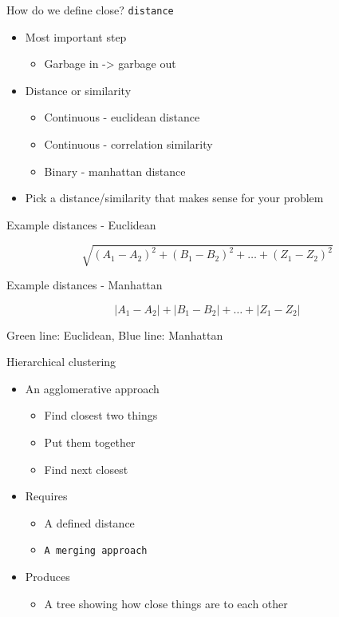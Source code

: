 \documentclass[]{book}
\providecommand{\tightlist}{%
  \setlength{\itemsep}{0pt}\setlength{\parskip}{0pt}}
\begin{document}
How do we define close? \texttt{distance}

\begin{itemize}
\tightlist
\item
  Most important step

  \begin{itemize}
  \tightlist
  \item
    Garbage in -\textgreater{} garbage out
  \end{itemize}
\item
  Distance or similarity

  \begin{itemize}
  \tightlist
  \item
    Continuous - euclidean distance
  \item
    Continuous - correlation similarity
  \item
    Binary - manhattan distance
  \end{itemize}
\item
  Pick a distance/similarity that makes sense for your problem
\end{itemize}

Example distances - Euclidean

\[\sqrt{(A_1-A_2)^2 + (B_1-B_2)^2 + \ldots + (Z_1-Z_2)^2}\]

Example distances - Manhattan

\[|A_1-A_2| + |B_1-B_2| + \ldots + |Z_1-Z_2|\]

Green line: Euclidean, Blue line: Manhattan

Hierarchical clustering

\begin{itemize}
\tightlist
\item
  An agglomerative approach

  \begin{itemize}
  \tightlist
  \item
    Find closest two things
  \item
    Put them together
  \item
    Find next closest
  \end{itemize}
\item
  Requires

  \begin{itemize}
  \tightlist
  \item
    A defined distance
  \item
    \texttt{A\ merging\ approach}
  \end{itemize}
\item
  Produces

  \begin{itemize}
  \tightlist
  \item
    A tree showing how close things are to each other
  \end{itemize}
\end{itemize}
\end{document}
